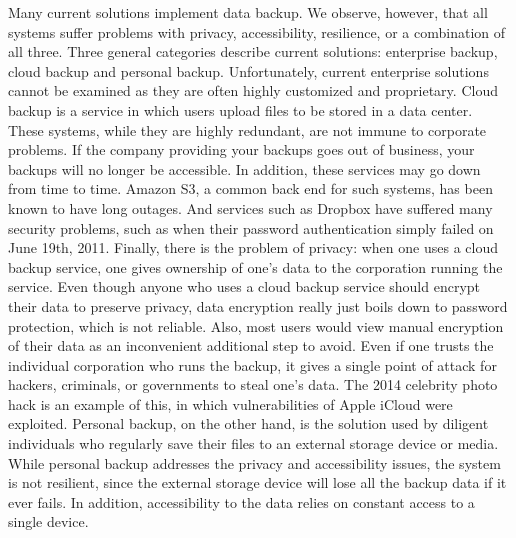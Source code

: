 Many current solutions implement data backup. We observe, however, that all systems suffer problems with privacy, accessibility, resilience, or a combination of all three. Three general categories describe current solutions: enterprise backup, cloud backup and personal backup. Unfortunately, current enterprise solutions cannot be examined as they are often highly customized and proprietary. Cloud backup is a service in which users upload files to be stored in a data center. These systems, while they are highly redundant, are not immune to corporate problems. If the company providing your backups goes out of business, your backups will no longer be accessible. In addition, these services may go down from time to time. Amazon S3, a common back end for such systems, has been known to have long outages. \cite{gigaom} \cite{rightscale}  And services such as Dropbox have suffered many security problems, such as when their password authentication simply failed on June 19th, 2011. \cite{dropbox_fail} Finally, there is the problem of privacy: when one uses a cloud backup service, one gives ownership of one's data to the corporation running the service.  Even though anyone who uses a cloud backup service should encrypt their data to preserve privacy, data encryption really just boils down to password protection, which is not reliable. \cite{password}  Also, most users would view manual encryption of their data as an inconvenient additional step to avoid.  Even if one trusts the individual corporation who runs the backup, it gives a single point of attack for hackers, criminals, or governments to steal one's data.  The 2014 celebrity photo hack is an example of this, in which vulnerabilities of Apple iCloud were exploited. \cite{theguardian}  Personal backup, on the other hand, is the solution used by diligent individuals who regularly save their files to an external storage device or media. While personal backup addresses the privacy and accessibility issues, the system is not resilient, since the external storage device will lose all the backup data if it ever fails. \cite{backblaze} In addition, accessibility to the data relies on constant access to a single device.

